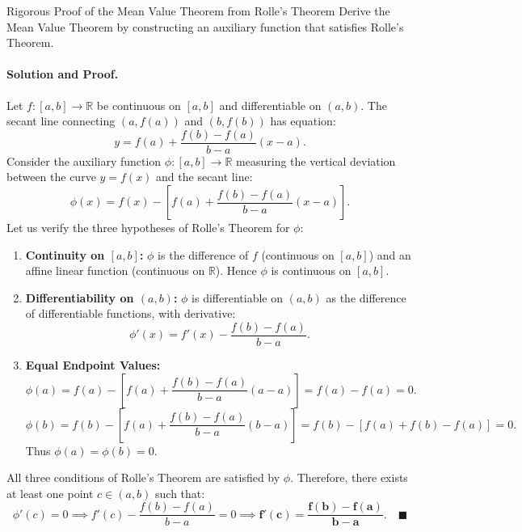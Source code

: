 \begin{workedexample}{Rigorous Proof of the Mean Value Theorem from Rolle's Theorem}
Derive the Mean Value Theorem by constructing an auxiliary function that satisfies Rolle's Theorem.

\paragraph{Solution and Proof.}
Let $f: [a, b] \longrightarrow \mathbb{R}$ be continuous on $[a, b]$ and differentiable on $(a, b)$.
The secant line connecting $(a, f(a))$ and $(b, f(b))$ has equation:
\[
y = f(a) + \frac{f(b) - f(a)}{b - a}(x - a).
\]
Consider the auxiliary function $\phi: [a, b] \longrightarrow \mathbb{R}$ measuring the vertical deviation between the curve $y = f(x)$ and the secant line:
\[
\phi(x) = f(x) - \left[ f(a) + \frac{f(b) - f(a)}{b - a}(x - a) \right].
\]
Let us verify the three hypotheses of Rolle's Theorem for $\phi$:
\begin{enumerate}[leftmargin=1.4em,itemsep=2pt]
  \item \textbf{Continuity on $[a, b]$:} $\phi$ is the difference of $f$ (continuous on $[a, b]$) and an affine linear function (continuous on $\mathbb{R}$). Hence $\phi$ is continuous on $[a, b]$.
  \item \textbf{Differentiability on $(a, b)$:} $\phi$ is differentiable on $(a, b)$ as the difference of differentiable functions, with derivative:
  \[
  \phi'(x) = f'(x) - \frac{f(b) - f(a)}{b - a}.
  \]
  \item \textbf{Equal Endpoint Values:}
  \[
  \phi(a) = f(a) - \left[ f(a) + \frac{f(b) - f(a)}{b - a}(a - a) \right] = f(a) - f(a) = 0.
  \]
  \[
  \phi(b) = f(b) - \left[ f(a) + \frac{f(b) - f(a)}{b - a}(b - a) \right] = f(b) - [f(a) + f(b) - f(a)] = 0.
  \]
  Thus $\phi(a) = \phi(b) = 0$.
\end{enumerate}
All three conditions of Rolle's Theorem are satisfied by $\phi$.
Therefore, there exists at least one point $c \in (a, b)$ such that:
\[
\phi'(c) = 0 \implies f'(c) - \frac{f(b) - f(a)}{b - a} = 0 \implies \mathbf{f'(c) = \frac{f(b) - f(a)}{b - a}}. \quad \blacksquare
\]
\end{workedexample}

